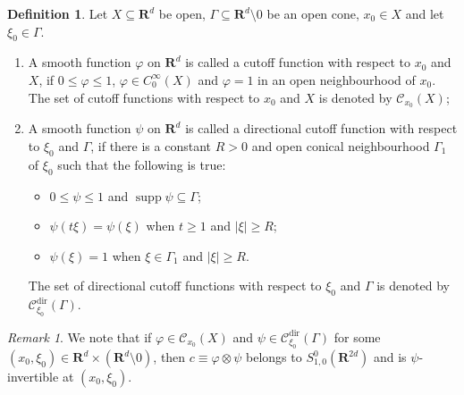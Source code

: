 \documentclass[12pt,a4paper,reqno]{amsart}
\numberwithin{equation}{section}
\numberwithin{thm}{section}
\theoremstyle{definition}
\newtheorem{defn}[thm]{Definition}
\theoremstyle{remark}
\newtheorem{rem}[thm]{Remark}
\begin{document}
\begin{defn}\label{cuttdef}
Let $X\subseteq {\mathbf R^{d}}$ be open, $\Gamma \subseteq {\mathbf R^{d}}{\setminus 0}$ be an open cone, $x_0\in X$ and let $\xi _0\in \Gamma $. 

\begin{enumerate}
\item A smooth function ${\varphi}$ on ${\mathbf R^{d}}$ is called a cutoff function with respect to $x_0$ and $X$, if $0\le {\varphi} \le 1$, ${\varphi} \in C_0^\infty (X)$ and ${\varphi} =1$ in an open neighbourhood of $x_0$. The set of cutoff functions with respect to $x_0$ and $X$ is denoted by $\mathscr C_{x_0}(X)$;

{\vspace{0.1cm}}

\item  A smooth function $\psi$ on ${\mathbf R^{d}}$ is called a directional cutoff function with respect to $\xi_0$ and $\Gamma$, if there is a constant $R>0$ and open conical neighbourhood $\Gamma _1$ of $\xi _0$ such that the following is true:
\begin{itemize}
\item $0\le \psi \le 1$ and ${\operatorname{supp}} \psi \subseteq \Gamma$;

{\vspace{0.1cm}}

\item  $\psi (t\xi )=\psi (\xi )$ when $t\ge 1$ and $|\xi |\ge R$;

{\vspace{0.1cm}}

\item $\psi (\xi )=1$ when $\xi \in \Gamma _1$ and $|\xi |\ge R$.
\end{itemize}

The set of directional cutoff functions with respect to $\xi _0$ and $\Gamma$ is denoted by $\mathscr C^{{\operatorname{dir}}}  _{\xi _0}(\Gamma )$.
\end{enumerate}

\end{defn}

\par

\begin{rem}\label{psiinvremark}
We note that if ${\varphi} \in \mathscr C_{x_0}(X)$ and $\psi \in \mathscr
C^{{\operatorname{dir}}}  _{\xi _0}(\Gamma )$ for some $(x_0,\xi _0)\in {\mathbf R^{d}}\times ({\mathbf R^{d}}{\setminus 0})$, then $c\equiv {\varphi} \otimes \psi$ belongs to $S^0_{1,0}({\mathbf R^{{2d}}})$ and is $\psi$-invertible at $(x_0,\xi _0)$.
\end{rem}
\end{document}
